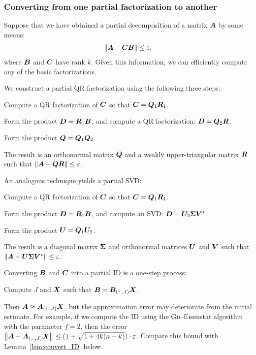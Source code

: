 \documentclass[final]{siamltex}
\newcounter{algorithm}[section]
\newcommand{\pgnotate}[1]{{\color{blue}[#1]}}
\begin{document}
\subsubsection{Converting from one partial factorization to another}
\label{sec:converting}

Suppose that we have obtained a partial decomposition of a matrix $\bm{A}$
by some means:
$$
\left\Vert { \bm{A} - \bm{CB} } \right\Vert \leq \varepsilon,
$$
where $\bm{B}$ and $\bm{C}$ have rank $k$. Given this information, we can
efficiently compute any of the basic factorizations.

We construct a partial QR factorization using the following three steps:
\lsp
\begin{remunerate}
\item Compute a QR factorization of $\bm{C}$ so that $\bm{C} = \bm{Q}_{1}\bm{R}_{1}$.
\item Form the product $\bm{D} = \bm{R}_{1}\bm{B}$, and compute a QR factorization: $\bm{D} = \bm{Q}_{2}\bm{R}$.
\item Form the product $\bm{Q} = \bm{Q}_{1}\bm{Q}_{2}$.
\end{remunerate}
\lsp
The result is an orthonormal matrix  $\bm{Q}$ and a weakly upper-triangular matrix $\bm{R}$ such
that $\left\Vert {\bm{A} - \bm{Q}\bm{R}} \right\Vert \leq \varepsilon$.

An analogous technique yields a partial SVD:
\lsp
\begin{remunerate}
\item Compute a QR factorization of $\bm{C}$ so that $\bm{C} = \bm{Q}_{1}\bm{R}_{1}$.
\item Form the product $\bm{D} = \bm{R}_{1}\bm{B}$, and compute an SVD:
      $\bm{D} = \bm{U}_{2}\bm{\Sigma}\bm{V}^{*}$.
\item Form the product $\bm{U} = \bm{Q}_{1}\bm{U}_{2}$.
\end{remunerate}
\lsp
The result is a diagonal matrix $\bm{\Sigma}$ and orthonormal matrices $\bm{U}$ and $\bm{V}$
such that $\left\Vert {\bm{A} - \bm{U}\bm{\Sigma}\bm{V}^{*}} \right\Vert \leq \varepsilon$.

Converting $\bm{B}$ and $\bm{C}$ into a partial ID is a one-step process:
\lsp
\begin{remunerate}
\item Compute $J$ and $\bm{X}$ such that $\bm{B} = \bm{B}_{(\colon,J)}\bm{X}$.
\end{remunerate}
\lsp
Then $\bm{A} \approx \bm{A}_{(\colon,J)}\bm{X}$, but the approximation error may
deteriorate from the initial estimate.  For example, if we compute the ID using the Gu--Eisenstat algorithm~\cite{gu_rrqr} with the parameter $f = 2$, then the error
${\bigl\Vert {\bm{A} - \bm{A}_{(\colon,J)}\bm{X}} \bigr\Vert}_{} \leq (1 + \sqrt{1 + 4k(n-k)}) \cdot \varepsilon$.
Compare this bound with Lemma~\ref{lem:convert_ID} below.
\end{document}
